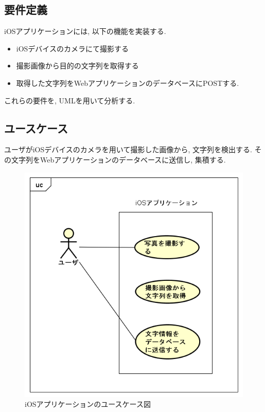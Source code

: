 \subsection{要件定義}
iOSアプリケーションには, 以下の機能を実装する.
\begin{itemize}
\item iOSデバイスのカメラにて撮影する
\item 撮影画像から目的の文字列を取得する
\item 取得した文字列をWebアプリケーションのデータベースにPOSTする.
\end{itemize}

これらの要件を, UMLを用いて分析する.

\subsection{ユースケース}
ユーザがiOSデバイスのカメラを用いて撮影した画像から, 文字列を検出する.
その文字列をWebアプリケーションのデータベースに送信し, 集積する.

\begin{figure}
\begin{center}
\includegraphics[width=14cm]{fig/usecase_ios.png}
\end{center}
\caption{iOSアプリケーションのユースケース図}
\end{figure}

